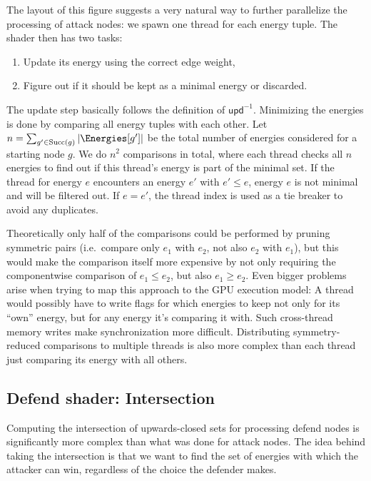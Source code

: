 The layout of this figure suggests a very natural way to further parallelize
the processing of attack nodes:
we spawn one thread for each energy tuple.
The shader then has two tasks:
\begin{enumerate}
    \item Update its energy using the correct edge weight,
    \item Figure out if it should be kept as a minimal energy or discarded.
\end{enumerate}

The update step basically follows the definition of $\mathsf{upd}^{-1}$.
Minimizing the energies is done by comparing all energy tuples with each other.
Let $n = \sum_{g' \in \mathrm{Succ}(g)} | \Energies[g'] |$ be the total number
of energies considered for a starting node $g$.
We do $n^2$ comparisons in total, where each thread checks all $n$
energies to find out if this thread's energy is part of the minimal set.
If the thread for energy $e$ encounters an energy $e'$ with $e' \leq e$,
energy $e$ is not minimal and will be filtered out. If $e = e'$, the thread
index is used as a tie breaker to avoid any duplicates.

Theoretically only half of the comparisons could be performed by pruning symmetric
pairs (i.e.\ compare only $e_1$ with $e_2$, not also $e_2$ with $e_1$),
but this would make the comparison itself more expensive by not only requiring
the componentwise comparison of $e_1 \leq e_2$, but also $e_1 \geq e_2$.
Even bigger problems arise when trying to map this approach to the GPU
execution model:
A thread would possibly have to write flags for which energies to keep not only
for its \enquote{own} energy,
but for any energy it's comparing it with.
Such cross-thread memory writes make synchronization more difficult.
Distributing symmetry-reduced comparisons to multiple threads is also
more complex than each thread just comparing its energy with all others.


\subsection{Defend shader: Intersection}

Computing the intersection of upwards-closed sets for processing defend nodes
is significantly more complex than what was done for attack nodes.
The idea behind taking the intersection is that we want to find the set of
energies with which the attacker can win,
regardless of the choice the defender makes.

